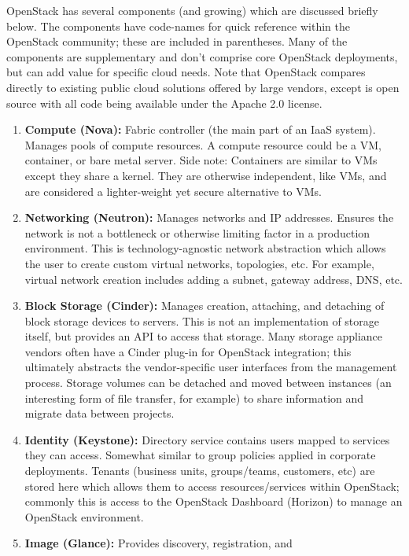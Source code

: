 OpenStack has several components (and growing) which are discussed briefly below.
The components have code-names for quick reference within the OpenStack
community; these are included in parentheses. Many of the components are
supplementary and don’t comprise core OpenStack deployments, but can add value
for specific cloud needs. Note that OpenStack compares directly to existing
public cloud solutions offered by large vendors, except is open source with
all code being available under the Apache 2.0 license.

\begin{enumerate}
  \item	\textbf{Compute (Nova):} Fabric controller (the main part of an IaaS
  system). Manages pools of compute resources. A compute resource could be a
  VM, container, or bare metal server. Side note: Containers are similar to
  VMs except they share a kernel. They are otherwise independent, like VMs,
  and are considered a lighter-weight yet secure alternative to VMs.
  \item	\textbf{Networking (Neutron):} Manages networks and IP addresses.
  Ensures the network is not a bottleneck or otherwise limiting factor in a
  production environment. This is technology-agnostic network abstraction
  which allows the user to create custom virtual networks, topologies, etc.
  For example, virtual network creation includes adding a subnet, gateway
  address, DNS, etc.
  \item	\textbf{Block Storage (Cinder):} Manages creation, attaching, and
  detaching of block storage devices to servers. This is not an implementation
  of storage itself, but provides an API to access that storage. Many storage
  appliance vendors often have a Cinder plug-in for OpenStack integration;
  this ultimately abstracts the vendor-specific user interfaces from the
  management process. Storage volumes can be detached and moved between
  instances (an interesting form of file transfer, for example) to share
  information and migrate data between projects.
  \item	\textbf{Identity (Keystone):} Directory service contains users mapped
  to services they can access. Somewhat similar to group policies applied in
  corporate deployments. Tenants (business units, groups/teams, customers,
  etc) are stored here which allows them to access resources/services within
  OpenStack; commonly this is access to the OpenStack Dashboard (Horizon) to
  manage an OpenStack environment.
  \item	\textbf{Image (Glance):} Provides discovery, registration, and

\end{enumerate}

